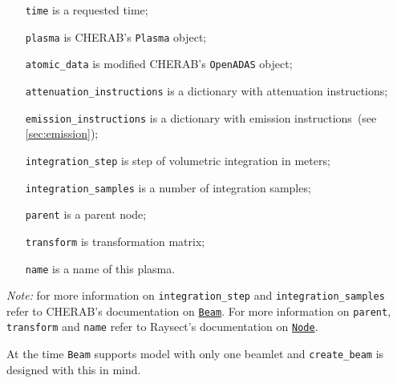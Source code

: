 \documentclass[../../main.tex]{subfiles}
\begin{document}
\begin{itemize}[align=left]
    \item[\texttt{time}] is a requested time;
    \item[\texttt{plasma}] is CHERAB's \texttt{Plasma} object;
    \item[\texttt{atomic\_data}] is modified CHERAB's \texttt{OpenADAS} object;
    \item[\texttt{attenuation\_instructions}] is a dictionary with attenuation instructions;
    \item[\texttt{emission\_instructions}] is a dictionary with emission instructions~(see \cref{sec:emission});
    \item[\texttt{integration\_step}] is step of volumetric integration in meters;
    \item[\texttt{integration\_samples}] is a number of integration samples;
    \item[\texttt{parent}] is a parent node;
    \item[\texttt{transform}] is transformation matrix;
    \item[\texttt{name}] is a name of this plasma.
\end{itemize}
\emph{Note: } for more information on \texttt{integration\_step} and \texttt{integration\_samples} refer to CHERAB's documentation on \href{https://cherab.github.io/documentation/plasmas/particle_beams.html?highlight=beam#cherab.core.Beam}{\texttt{Beam}}.
For more information on \texttt{parent}, \texttt{transform} and \texttt{name} refer to Raysect's documentation on \href{https://raysect.github.io/documentation/api_reference/edge/raysect_edge_scenegraph.html?highlight=node#raysect.edge.scenegraph.node.Node}{\texttt{Node}}.

At the time \texttt{Beam} supports model with only one beamlet and \texttt{create\_beam} is designed with this in mind.
\end{document}
